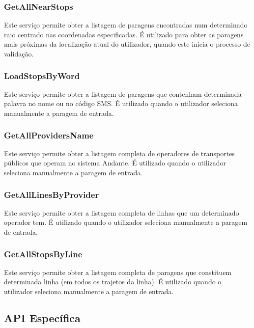 \subsubsection{GetAllNearStops}

Este serviço permite obter a listagem de paragens encontradas num determinado raio centrado nas coordenadas especificadas. É utilizado para obter as paragens mais próximas da localização atual do utilizador, quando este inicia o processo de validação.

\subsubsection{LoadStopsByWord}

Este serviço permite obter a listagem de paragens que contenham determinada palavra no nome ou no código SMS. É utilizado quando o utilizador seleciona manualmente a paragem de entrada.

\subsubsection{GetAllProvidersName}

Este serviço permite obter a listagem completa de operadores de transportes públicos que operam no sistema Andante. É utilizado quando o utilizador seleciona manualmente a paragem de entrada.

\subsubsection{GetAllLinesByProvider}

Este serviço permite obter a listagem completa de linhas que um determinado operador tem. É utilizado quando o utilizador seleciona manualmente a paragem de entrada.

\subsubsection{GetAllStopsByLine}

Este serviço permite obter a listagem completa de paragens que constituem determinada linha (em todos os trajetos da linha). É utilizado quando o utilizador seleciona manualmente a paragem de entrada.

\subsection{API Específica}

